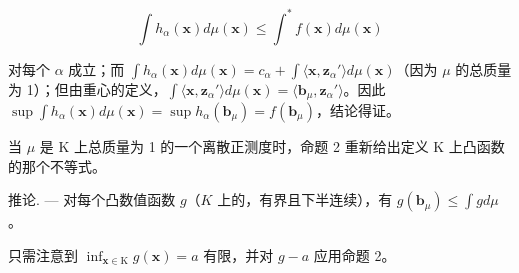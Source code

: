 \[
\int h _ {\alpha} (\mathbf {x}) d \mu (\mathbf {x}) \leqslant \int^ {*} f (\mathbf {x}) d \mu (\mathbf {x})
\]

对每个 \(\alpha\) 成立；而 \(\int h_{\alpha}(\mathbf{x}) d\mu (\mathbf{x}) = c_{\alpha} + \int \langle \mathbf{x}, \mathbf{z}_{\alpha}' \rangle d\mu (\mathbf{x})\)（因为 \(\mu\) 的总质量为 1）；但由重心的定义，\(\int \langle \mathbf{x}, \mathbf{z}_{\alpha}' \rangle d\mu (\mathbf{x}) = \langle \mathbf{b}_{\mu}, \mathbf{z}_{\alpha}' \rangle\)。因此 \(\sup \int h_{\alpha}(\mathbf{x}) d\mu (\mathbf{x}) = \sup h_{\alpha}(\mathbf{b}_{\mu}) = f(\mathbf{b}_{\mu})\)，结论得证。

当 \(\mu\) 是 K 上总质量为 1 的一个离散正测度时，命题 2 重新给出定义 K 上凸函数的那个不等式。

推论. --- 对每个凸数值函数 \(g\)（\(K\) 上的，有界且下半连续），有 \(g(\mathbf{b}_{\mu}) \leqslant \int g d\mu\) 。

只需注意到 \(\inf_{\mathbf{x} \in \mathrm{K}} g(\mathbf{x}) = a\) 有限，并对 \(g - a\) 应用命题 2。
\relax{}
